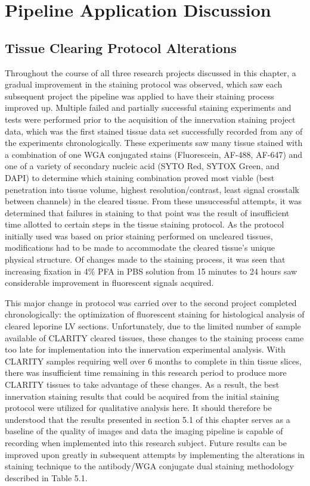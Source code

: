 \section{Pipeline Application Discussion}
\subsection{Tissue Clearing Protocol Alterations}

Throughout the course of all three research projects discussed in this chapter, a gradual improvement in the staining protocol was observed, which saw each subsequent project the pipeline was applied to have their staining process improved up. Multiple failed and partially successful staining experiments and tests were performed prior to the acquisition of the innervation staining project data, which was the first stained tissue data set successfully recorded from any of the experiments chronologically. These experiments saw many tissue stained with a combination of one WGA conjugated stains (Fluorescein, AF-488, AF-647) and one of a variety of secondary nucleic acid (SYTO Red, SYTOX Green, and DAPI) to determine which staining combination proved most viable (best penetration into tissue volume, highest resolution/contrast, least signal crosstalk between channels) in the cleared tissue. From these unsuccessful attempts, it was determined that failures in staining to that point was the result of insufficient time allotted to certain steps in the tissue staining protocol. As the protocol initially used was based on prior staining performed on uncleared tissues, modifications had to be made to accommodate the cleared tissue's unique physical structure. Of changes made to the staining process, it was seen that increasing fixation in 4\% PFA in PBS solution from 15 minutes to 24 hours saw considerable improvement in fluorescent signals acquired. 

This major change in protocol was carried over to the second project completed chronologically: the optimization of fluorescent staining for histological analysis of cleared leporine LV sections. Unfortunately, due to the limited number of sample available of CLARITY cleared tissues, these changes to the staining process came too late for implementation into the innervation experimental analysis. With CLARITY samples requiring well over 6 months to complete in thin tissue slices, there was insufficient time remaining in this research period to produce more CLARITY tissues to take advantage of these changes. As a result, the best innervation staining results that could be acquired from the initial staining protocol were utilized for qualitative analysis here. It should therefore be understood that the results presented in section 5.1 of this chapter serves as a baseline of the quality of images and data the imaging pipeline is capable of recording when implemented into this research subject. Future results can be improved upon greatly in subsequent attempts by implementing the alterations in staining technique to the antibody/WGA conjugate dual staining methodology described in Table 5.1. 

